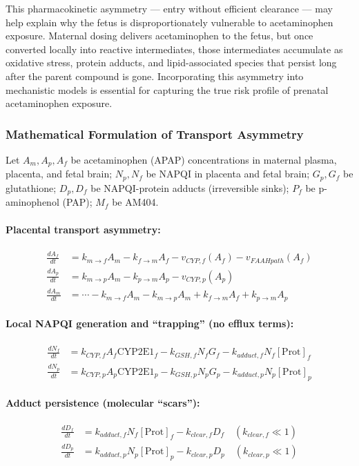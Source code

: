 \documentclass[11pt]{article}
\let\oldsubsubsection\subsubsection
\renewcommand{\subsubsection}[1]{\oldsubsubsection{#1}\setlength{\leftskip}{1.5em}}
\begin{document}
This pharmacokinetic asymmetry — entry without efficient clearance — may help explain why the fetus is disproportionately vulnerable to acetaminophen exposure. Maternal dosing delivers acetaminophen to the fetus, but once converted locally into reactive intermediates, those intermediates accumulate as oxidative stress, protein adducts, and lipid-associated species that persist long after the parent compound is gone. Incorporating this asymmetry into mechanistic models is essential for capturing the true risk profile of prenatal acetaminophen exposure.

\subsubsection{Mathematical Formulation of Transport Asymmetry}

Let $A_m, A_p, A_f$ be acetaminophen (APAP) concentrations in maternal plasma, placenta, and fetal brain; $N_p, N_f$ be NAPQI in placenta and fetal brain; $G_p, G_f$ be glutathione; $D_p, D_f$ be NAPQI-protein adducts (irreversible sinks); $P_f$ be p-aminophenol (PAP); $M_f$ be AM404.

\paragraph{Placental transport asymmetry:}
\begin{align}
\frac{dA_f}{dt} &= k_{m \rightarrow f} A_m - k_{f \rightarrow m} A_f - v_{CYP,f}(A_f) - v_{FAAH path}(A_f) \\
\frac{dA_p}{dt} &= k_{m \rightarrow p} A_m - k_{p \rightarrow m} A_p - v_{CYP,p}(A_p) \\
\frac{dA_m}{dt} &= \cdots - k_{m \rightarrow f}A_m - k_{m \rightarrow p}A_m + k_{f \rightarrow m}A_f + k_{p \rightarrow m}A_p
\end{align}

\paragraph{Local NAPQI generation and ``trapping'' (no efflux terms):}
\begin{align}
\frac{dN_f}{dt} &= k_{CYP,f} A_f \text{CYP2E1}_f - k_{GSH,f} N_f G_f - k_{adduct,f} N_f [\text{Prot}]_f \\
\frac{dN_p}{dt} &= k_{CYP,p} A_p \text{CYP2E1}_p - k_{GSH,p} N_p G_p - k_{adduct,p} N_p [\text{Prot}]_p
\end{align}

\paragraph{Adduct persistence (molecular ``scars''):}
\begin{align}
\frac{dD_f}{dt} &= k_{adduct,f} N_f [\text{Prot}]_f - k_{clear,f} D_f \quad (k_{clear,f} \ll 1) \\
\frac{dD_p}{dt} &= k_{adduct,p} N_p [\text{Prot}]_p - k_{clear,p} D_p \quad (k_{clear,p} \ll 1)
\end{align}
\end{document}
